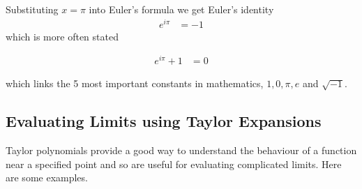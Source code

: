 Substituting $x=\pi$ into Euler's formula we get Euler's identity
 \begin{align*}
  e^{i \pi} &= -1
\end{align*}
which is more often stated
\begin{impeqn}
\begin{align*}
  e^{i\pi} + 1 &= 0
\end{align*}
\end{impeqn}
which links the 5 most important constants in mathematics, $1,0,\pi,e$ and $\sqrt{-1}$.

%


\subsection{Evaluating Limits using Taylor Expansions}

Taylor polynomials provide a good way to understand the behaviour of a
function near a specified point and so are useful for evaluating
complicated limits. Here are some examples.

